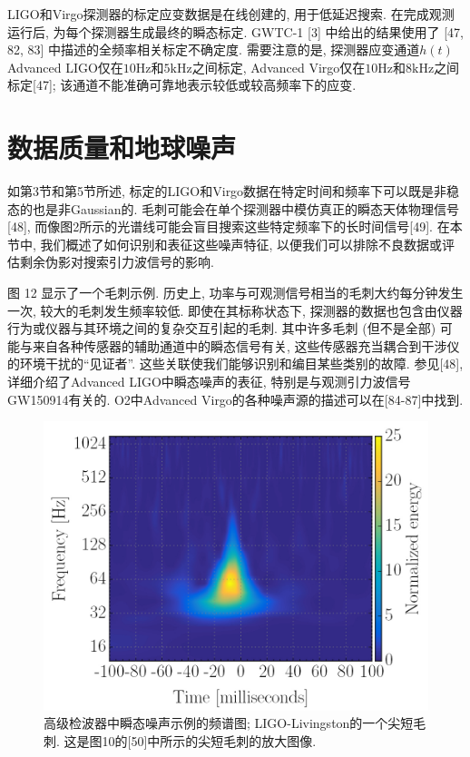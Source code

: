 \documentclass[a4paper]{\documentclassname}
\def\t{\text}
\theoremstyle{definition}
\begin{document}
LIGO和Virgo探测器的标定应变数据是在线创建的, 用于低延迟搜索. 在完成观测运行后, 为每个探测器生成最终的瞬态标定. GWTC-1 [3] 中给出的结果使用了 [47,  82,  83] 中描述的全频率相关标定不确定度. 需要注意的是, 探测器应变通道$h(t)$Advanced LIGO仅在$10 \t{Hz}$和$5 \t{kHz}$之间标定, Advanced Virgo仅在$10 \t{Hz}$和$8 \t{kHz}$之间标定[47]; 该通道不能准确可靠地表示较低或较高频率下的应变. 

\section{数据质量和地球噪声}

如第3节和第5节所述, 标定的LIGO和Virgo数据在特定时间和频率下可以既是非稳态的也是非Gaussian的. 毛刺可能会在单个探测器中模仿真正的瞬态天体物理信号[48], 而像图2所示的光谱线可能会盲目搜索这些特定频率下的长时间信号[49]. 在本节中, 我们概述了如何识别和表征这些噪声特征, 以便我们可以排除不良数据或评估剩余伪影对搜索引力波信号的影响. 

图 12 显示了一个毛刺示例. 历史上, 功率与可观测信号相当的毛刺大约每分钟发生一次, 较大的毛刺发生频率较低. 即使在其标称状态下, 探测器的数据也包含由仪器行为或仪器与其环境之间的复杂交互引起的毛刺. 其中许多毛刺 (但不是全部) 可能与来自各种传感器的辅助通道中的瞬态信号有关, 这些传感器充当耦合到干涉仪的环境干扰的``见证者''. 这些关联使我们能够识别和编目某些类别的故障. 参见[48], 详细介绍了Advanced LIGO中瞬态噪声的表征, 特别是与观测引力波信号GW150914有关的. O2中Advanced Virgo的各种噪声源的描述可以在[84-87]中找到. 
\begin{figure}[htbp]
    \centering
    \includegraphics{img/12.jpg}
    \caption{
        高级检波器中瞬态噪声示例的频谱图; LIGO-Livingston的一个尖短毛刺. 这是图10的[50]中所示的尖短毛刺的放大图像. 
    }
\end{figure}
\end{document}
